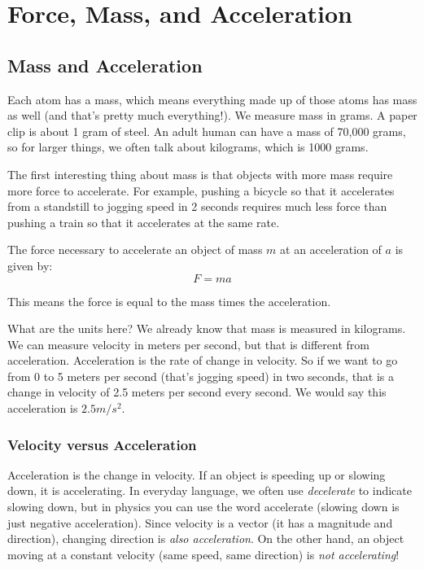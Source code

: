 \chapter{Force, Mass, and Acceleration}

\section{Mass and Acceleration}

Each atom has a mass, which means everything made up of those atoms has mass as 
well (and that's pretty much everything!). We measure mass in grams. A paper clip 
is about 1 gram of steel. An adult human can have a mass of 70,000 grams, so for 
larger things, we often talk about kilograms, which is 1000 grams.

The first interesting thing about mass is that objects with more mass
require more force to accelerate. For example, pushing a bicycle so
that it accelerates from a standstill to jogging speed in 2 seconds
requires much less force than pushing a train so that it accelerates
at the same rate.


\begin{mdframed}[style=important, frametitle={Newton's Second Law of Motion}]

The force necessary to accelerate an object of mass $m$ at an acceleration of
$a$ is given by:
$$F = m a$$

This means the force is equal to the mass times the acceleration.

\end{mdframed}

What are the units here? We already know that mass is measured in
kilograms. We can measure velocity in meters per second, but that is
different from acceleration. Acceleration is the rate of change in
velocity. So if we want to go from 0 to 5 meters per second (that's
jogging speed) in two seconds, that is a change in velocity of 2.5
meters per second every second. We would say this acceleration is $2.5
m/s^2$.

\subsection{Velocity versus Acceleration}
Acceleration is the change in velocity. If an object is speeding up or slowing down, it is accelerating. In everyday language, we often use \textit{decelerate} to indicate slowing down, but in physics you can use the word accelerate (slowing down is just negative acceleration). Since velocity is a vector (it has a magnitude and direction), changing direction is \textit{also acceleration}. On the other hand, an object moving at a constant velocity (same speed, same direction) is \textit{not accelerating}!

